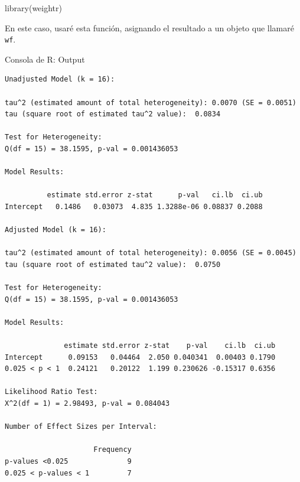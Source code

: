 \documentclass[
  bookmarksnumbered]{article}
\newenvironment{Shaded}{\begin{snugshade}}{\end{snugshade}}
\newcommand{\AttributeTok}[1]{\textcolor[rgb]{0.00,0.34,0.68}{#1}}
\newcommand{\ConstantTok}[1]{\textcolor[rgb]{0.67,0.33,0.00}{#1}}
\newcommand{\FunctionTok}[1]{\textcolor[rgb]{0.39,0.29,0.61}{#1}}
\newcommand{\NormalTok}[1]{\textcolor[rgb]{0.12,0.11,0.11}{#1}}
\newcommand{\OtherTok}[1]{\textcolor[rgb]{0.00,0.43,0.16}{#1}}
\newcommand{\SpecialCharTok}[1]{\textcolor[rgb]{0.24,0.68,0.91}{#1}}
\begin{document}
\begin{Shaded}
\begin{Highlighting}[]
\FunctionTok{library}\NormalTok{(weightr)}
\end{Highlighting}
\end{Shaded}

En este caso, usaré esta función, asignando el resultado a un objeto que llamaré \texttt{wf}.

\begin{Shaded}
\end{Shaded}

\begin{ROut}{Consola de R: Output~\thetcbcounter}
                \begin{footnotesize}
                \begin{verbatim} 
Unadjusted Model (k = 16):

tau^2 (estimated amount of total heterogeneity): 0.0070 (SE = 0.0051)
tau (square root of estimated tau^2 value):  0.0834

Test for Heterogeneity:
Q(df = 15) = 38.1595, p-val = 0.001436053

Model Results:

          estimate std.error z-stat      p-val   ci.lb  ci.ub
Intercept   0.1486   0.03073  4.835 1.3288e-06 0.08837 0.2088

Adjusted Model (k = 16):

tau^2 (estimated amount of total heterogeneity): 0.0056 (SE = 0.0045)
tau (square root of estimated tau^2 value):  0.0750

Test for Heterogeneity:
Q(df = 15) = 38.1595, p-val = 0.001436053

Model Results:

              estimate std.error z-stat    p-val    ci.lb  ci.ub
Intercept      0.09153   0.04464  2.050 0.040341  0.00403 0.1790
0.025 < p < 1  0.24121   0.20122  1.199 0.230626 -0.15317 0.6356

Likelihood Ratio Test:
X^2(df = 1) = 2.98493, p-val = 0.084043

Number of Effect Sizes per Interval:

                     Frequency
p-values <0.025              9
0.025 < p-values < 1         7
 \end{verbatim}
                \end{footnotesize}
                \end{ROut}
\end{document}
